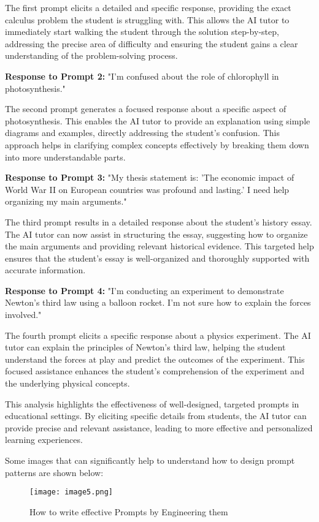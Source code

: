 The first prompt elicits a detailed and specific response, providing the exact calculus problem the student is struggling with. This allows the AI tutor to immediately start walking the student through the solution step-by-step, addressing the precise area of difficulty and ensuring the student gains a clear understanding of the problem-solving process.

\textbf{Response to Prompt 2:} "I'm confused about the role of chlorophyll in photosynthesis."

The second prompt generates a focused response about a specific aspect of photosynthesis. This enables the AI tutor to provide an explanation using simple diagrams and examples, directly addressing the student's confusion. This approach helps in clarifying complex concepts effectively by breaking them down into more understandable parts.

\textbf{Response to Prompt 3:} "My thesis statement is: 'The economic impact of World War II on European countries was profound and lasting.' I need help organizing my main arguments."

The third prompt results in a detailed response about the student's history essay. The AI tutor can now assist in structuring the essay, suggesting how to organize the main arguments and providing relevant historical evidence. This targeted help ensures that the student’s essay is well-organized and thoroughly supported with accurate information.

\textbf{Response to Prompt 4:} "I'm conducting an experiment to demonstrate Newton's third law using a balloon rocket. I'm not sure how to explain the forces involved."

The fourth prompt elicits a specific response about a physics experiment. The AI tutor can explain the principles of Newton's third law, helping the student understand the forces at play and predict the outcomes of the experiment. This focused assistance enhances the student's comprehension of the experiment and the underlying physical concepts.

This analysis highlights the effectiveness of well-designed, targeted prompts in educational settings. By eliciting specific details from students, the AI tutor can provide precise and relevant assistance, leading to more effective and personalized learning experiences. 

Some images that can significantly help to understand how to design prompt patterns are shown below:


\begin{figure}
    \centering
    \texttt{[image: image5.png]}
    \caption{How to write effective Prompts by Engineering them}
    \label{fig:enter-label}
\end{figure}

